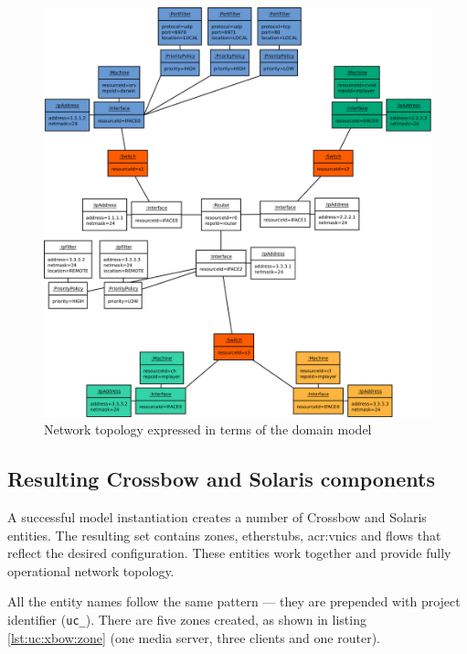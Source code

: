 \documentclass[11pt,openany]{book}
\begin{document}
        \begin{figure}[H]
          \includegraphics[width=.9\textwidth]{img/test-case/topology-om.pdf}

          \caption{Network topology expressed in terms of the domain model}
          \label{fig:cs:topo}
        \end{figure}

      
      
      \subsection{Resulting Crossbow and Solaris components}
      \label{sub:uc:xbow}

        A successful model instantiation creates a number of Crossbow and Solaris entities. The resulting set contains
        zones, etherstubs, \gls{acr:vnic}s and flows that reflect the desired configuration. These entities work together and
        provide fully operational network topology.

        All the entity names follow the same pattern --- they are prepended with project identifier (\texttt{uc\_}).
        There are five zones created, as shown in listing \ref{lst:uc:xbow:zone} (one media server, three clients and
        one router). \\

        \noindent
        \begin{minipage}{\textwidth}
          
        \end{minipage}
\end{document}
